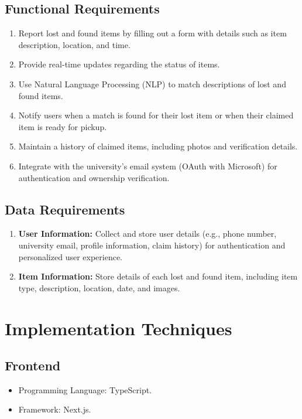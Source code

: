 \subsection{Functional Requirements}
\begin{enumerate}
    \item Report lost and found items by filling out a form with details such as item description, location, and time.
    \item Provide real-time updates regarding the status of items.
    \item Use Natural Language Processing (NLP) to match descriptions of lost and found items.
    \item Notify users when a match is found for their lost item or when their claimed item is ready for pickup.
    \item Maintain a history of claimed items, including photos and verification details.
    \item Integrate with the university’s email system (OAuth with Microsoft) for authentication and ownership verification.
\end{enumerate}

\subsection{Data Requirements}
\begin{enumerate}
    \item \textbf{User Information:} Collect and store user details (e.g., phone number, university email, profile information, claim history) for authentication and personalized user experience.
    \item \textbf{Item Information:} Store details of each lost and found item, including item type, description, location, date, and images.
\end{enumerate}

\section{Implementation Techniques}
\subsection{Frontend}
\begin{itemize}
    \item Programming Language: TypeScript.
    \item Framework: Next.js.
\end{itemize}

